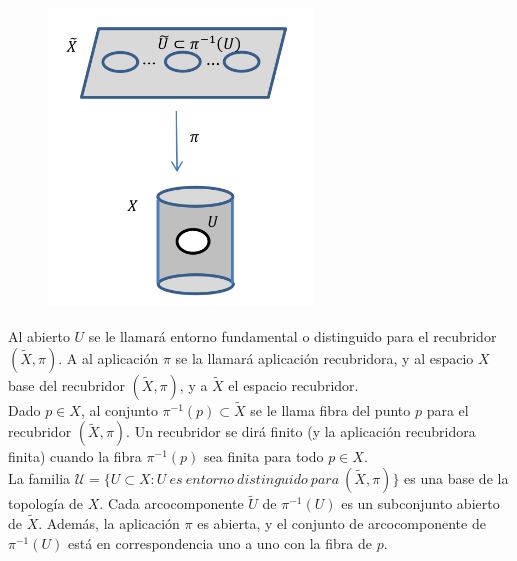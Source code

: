 \documentclass{article}
\begin{document}
\begin{figure}[h]
\centering
\includegraphics[scale=1,width=7cm, height=8cm]{recubridor.png}
\end{figure}

Al abierto $U$ se le llamará entorno fundamental o distinguido para el recubridor $(\tilde{X},\pi)$. A al aplicación $\pi$ se la llamará aplicación recubridora, y al espacio $X$ base del recubridor $(\tilde{X},\pi)$, y a $\tilde{X}$ el espacio recubridor. \\

Dado $p\in X$, al conjunto $\pi^{-1}(p)\subset \tilde{X}$ se le llama fibra del punto $p$ para el recubridor $(\tilde{X},\pi)$. Un recubridor se dirá finito (y la aplicación recubridora finita) cuando la fibra $\pi^{-1}(p)$ sea finita para todo $p\in X$. \\

La familia $\mathcal{U}=\{U\subset X:U\:es\:entorno\:distinguido\:para\:(\tilde{X},\pi)\}$ es una base de la topología de $X$. Cada arcocomponente $\tilde{U}$ de $\pi^{-1}(U)$ es un subconjunto abierto de $\tilde{X}$. Además, la aplicación $\pi$ es abierta, y el conjunto de arcocomponente de $\pi^{-1}(U)$ está en correspondencia uno a uno con la fibra de $p$.\\
\end{document}
